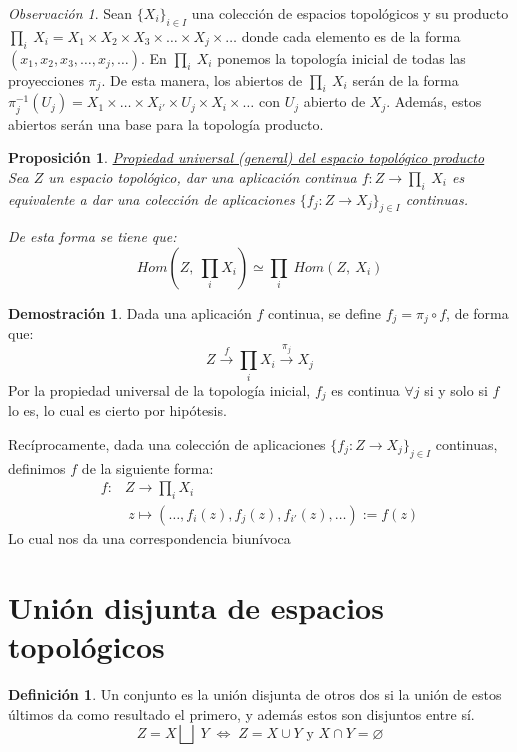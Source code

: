 \documentclass[12pt,twoside]{report}
\theoremstyle{azul}
\theoremstyle{azul2}
\theoremstyle{plain}
\newtheorem*{prop}{Proposición}
\theoremstyle{definition}
\newtheorem*{defi}{Definición}
\newtheorem*{dem}{Demostración}
\theoremstyle{remark}
\newtheorem*{obs}{Observación}
\begin{document}
\begin{obs}
Sean $\{ X_i\}_{i \in I}$ una colección de espacios topológicos y su producto $\underset{i}{\prod} \: X_i = X_1 \times X_2 \times X_3 \times \ldots \times X_j\times\ldots$ donde cada elemento es de la forma $(x_1, x_2, x_3, \ldots , x_j,\ldots)$. En $\underset{i}{\prod} \: X_i$ ponemos la topología inicial de todas las proyecciones $\pi_j$. De esta manera, los abiertos de $\underset{i}{\prod} \: X_i$ serán de la forma $\pi_j^{-1}(U_j)= X_1\times\ldots \times X_{i'} \times U_j \times X_i \times \ldots$ con $U_j$ abierto de $X_j$. Además, estos abiertos serán una base para la topología producto.
\end{obs}
\begin{prop}\underline{Propiedad universal (general) del espacio topológico producto}\\
Sea $Z$ un espacio topológico, dar una aplicación continua $f: Z \longrightarrow \underset{i}{\prod} \: X_i$ es equivalente a dar una colección de aplicaciones $\{f_j: Z {\longrightarrow} X_j \}_{j \in I}$ continuas.

De esta forma se tiene que:
$$Hom(Z, \: \underset{i}{\prod} X_i) \simeq \underset{i}{\prod} \: Hom (Z, \: X_i) $$
\end{prop}
\begin{dem}
Dada una aplicación $f$ continua, se define $f_j=\pi_j \circ f$, de forma que:
$$Z \stackrel{f}{\longrightarrow} \prod_i X_i \stackrel{\pi_j}{\longrightarrow} X_j$$
Por la propiedad universal de la topología inicial, $f_j$ es continua $\forall j$ si y solo si $f$ lo es, lo cual es cierto por hipótesis.

Recíprocamente, dada una colección de aplicaciones $\{f_j: Z {\longrightarrow} X_j \}_{j \in I}$ continuas, definimos $f$ de la siguiente forma:
$$\begin{array}{rl}
     f : & Z \longrightarrow  \underset{i}{\prod} X_i \\
        & \: z \longmapsto (\ldots, f_i(z), f_j(z),f_{i'}(z),\ldots):=f(z)
\end{array}$$
Lo cual nos da una correspondencia biunívoca
\end{dem}

\section{Unión disjunta de espacios topológicos} 

\begin{defi}
Un conjunto es la unión disjunta de otros dos si la unión de estos últimos da como resultado el primero, y además estos son disjuntos entre sí.
$$Z = X \bigsqcup \; Y \; \Leftrightarrow \; Z = X \cup Y \text{ y } X \cap Y = \varnothing$$
\end{defi}
\end{document}
